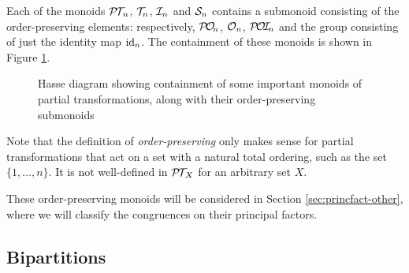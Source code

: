 Each of the monoids $\mathcal{P\!T\!}_n$, $\mathcal{T}_n$, $\mathcal{I}_n$ and $\mathcal{S}_n$ contains a submonoid
consisting of the order-preserving elements: respectively, $\mathcal{P\!O\!}_n$, $\mathcal{O}_n$,
$\mathcal{P\!O\!I\!}_n$ and the group consisting of just the identity map $\operatorname{id}_n$.  The
containment of these monoids is shown in Figure \ref{fig:ord-pres}.

\begin{figure}[ht]
  \centering
  \caption[Important monoids of partial transformations]{Hasse diagram showing
    containment of some important monoids of partial transformations, along with
    their order-preserving submonoids}
  \label{fig:ord-pres}
\end{figure}

Note that the definition of \textit{order-preserving} only makes sense for
partial transformations that act on a set with a natural total ordering, such as
the set $\{1, \ldots, n\}$.  It is not well-defined in $\mathcal{P\!T\!}_X$ for an arbitrary
set $X$.

These order-preserving monoids will be considered in Section
\ref{sec:princfact-other}, where we will classify the congruences on their
principal factors.

\subsection{Bipartitions}
\label{sec:bipartitions}

